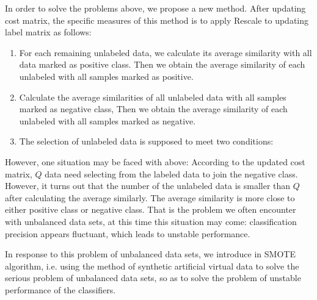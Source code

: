 \documentclass{svjour3}                     %
\begin{document}
In order to solve the problems above, we propose a new method. After updating cost matrix, the specific measures of this method is to apply Rescale to updating label matrix as follows:
\begin{enumerate}[Step 1]
\item  For each remaining unlabeled data, we calculate its average similarity with all data marked as positive class. Then we obtain the average similarity of each unlabeled with all samples marked as positive.
\item Calculate the average similarities of all unlabeled data with all samples marked as negative class, Then we obtain the average similarity of each unlabeled with all samples marked as  negative.
\item The selection of unlabeled data is supposed to meet two conditions:
\end{enumerate}
However, one situation may be faced with above: According to the updated cost matrix, $Q$ data need selecting from the labeled data to join the negative class. However, it turns out that the number of the unlabeled data is smaller than $Q$  after calculating the average similarly. The average similarity is more close to either positive class or negative class. That is the problem we often encounter with unbalanced data sets, at this time this situation may come: classification precision appears fluctuant, which leads to unstable performance.

In response to this problem of unbalanced data sets, we introduce in SMOTE algorithm, i.e. using the method of synthetic artificial virtual data to solve the serious problem of unbalanced data sets, so as to solve the problem of unstable performance of the classifiers.
\end{document}
